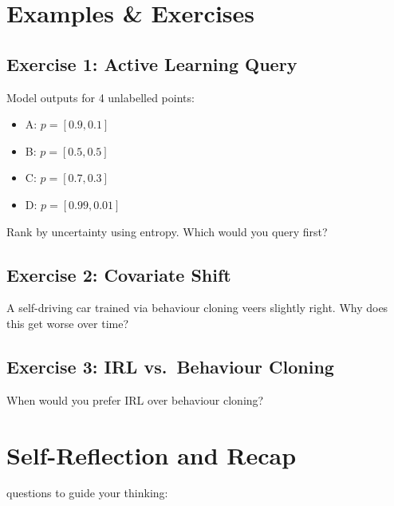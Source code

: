 \newpage
\section{Examples \& Exercises}

\subsection{Exercise 1: Active Learning Query}

Model outputs for 4 unlabelled points:
\begin{itemize}
    \item A: $p = [0.9, 0.1]$
    \item B: $p = [0.5, 0.5]$
    \item C: $p = [0.7, 0.3]$
    \item D: $p = [0.99, 0.01]$
\end{itemize}

Rank by uncertainty using entropy. Which would you query first?

\subsection{Exercise 2: Covariate Shift}

A self-driving car trained via behaviour cloning veers slightly right. Why does this get worse over time?

\subsection{Exercise 3: IRL vs.\ Behaviour Cloning}

When would you prefer IRL over behaviour cloning?


\fi

\section{Self-Reflection and Recap}

 questions to guide your thinking:

